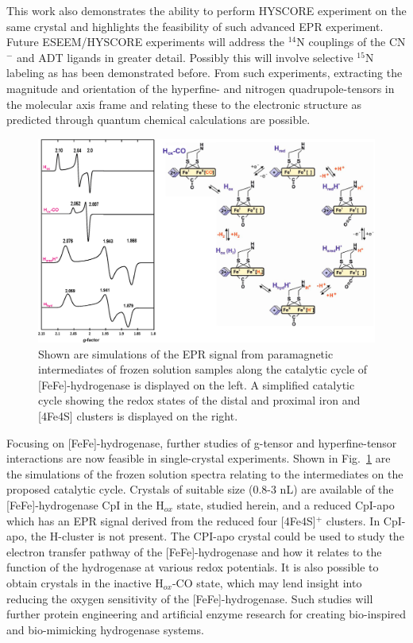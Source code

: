 This work also demonstrates the ability to perform HYSCORE experiment on the same crystal and highlights the feasibility of such advanced EPR experiment. Future ESEEM/HYSCORE experiments will address the $^{14}$N couplings of the CN$^-$ and ADT ligands in greater detail. Possibly this will involve selective $^{15}$N labeling as has been demonstrated before. \cite{Adamska2015, AdamskaBridgingAmine} From such experiments, extracting the magnitude and orientation of the hyperfine- and nitrogen quadrupole-tensors in the molecular axis frame and relating these to the electronic structure as predicted through quantum chemical calculations are possible. 
\begin{figure}[htbp]
\centering
 \includegraphics[width=\textwidth]{Kapitel/end-images/Ch6-EPRCat.eps}
 \caption[EPR Signals along the catalytic cycle of FeFe-Hydrogenase.]{Shown are simulations of the EPR signal from paramagnetic intermediates of frozen solution samples along the catalytic cycle of [FeFe]-hydrogenase is displayed on the left. A simplified catalytic cycle showing the redox states of the distal and proximal iron and [4Fe4S] clusters is displayed on the right.} 
 \label{fig:FeFeCatCycle}
\end{figure}

Focusing on [FeFe]-hydrogenase, further studies of g-tensor and hyperfine-tensor interactions are now feasible in single-crystal experiments. Shown in Fig.~\ref{fig:FeFeCatCycle} are the simulations of the frozen solution spectra relating to the intermediates on the proposed catalytic cycle. \cite{lubitzhyd} Crystals of suitable size (0.8-3 nL) are available of the [FeFe]-hydrogenase CpI in the H$_{ox}$ state, studied herein, and a reduced CpI-apo which has an EPR signal derived from the reduced four [4Fe4S]$^+$ clusters. In CpI-apo, the H-cluster is not present. The CPI-apo crystal could be used to study the electron transfer pathway of the [FeFe]-hydrogenase and how it relates to the function of the hydrogenase at various redox potentials. It is also possible to obtain crystals in the inactive H$_{ox}$-CO state, which may lend insight into reducing the oxygen sensitivity of the [FeFe]-hydrogenase. Such studies will further protein engineering and artificial enzyme research for creating bio-inspired and bio-mimicking hydrogenase systems. \cite{C7SE00582B}


{\renewcommand{\bibsection}{\clearpage\section*{\bibname}\markboth{\bibname}{\bibname}}
\renewcommand{\bibname}{CHAPTER 6. REFERENCES}


}